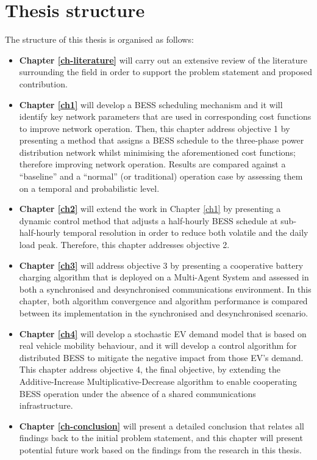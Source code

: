 \section{Thesis structure}
\label{ch-introduction:sec:thesis-structure}

The structure of this thesis is organised as follows:

\begin{itemize}
	\item
	\textbf{Chapter \ref{ch-literature}} will carry out an extensive review of the literature surrounding the field in order to support the problem statement and proposed contribution.
	\item
	\textbf{Chapter \ref{ch1}} will develop a BESS scheduling mechanism and it will identify key network parameters that are used in corresponding cost functions to improve network operation.
	Then, this chapter address objective 1 by presenting a method that assigns a BESS schedule to the three-phase power distribution network whilst minimising the aforementioned cost functions; therefore improving network operation.
	Results are compared against a ``baseline'' and a ``normal'' (or traditional) operation case by assessing them on a temporal and probabilistic level.
	\item
	\textbf{Chapter \ref{ch2}} will extend the work in Chapter \ref{ch1} by presenting a dynamic control method that adjusts a half-hourly BESS schedule at sub-half-hourly temporal resolution in order to reduce both volatile and the daily load peak.
	Therefore, this chapter addresses objective 2.
	\item
	\textbf{Chapter \ref{ch3}} will address objective 3 by presenting a cooperative battery charging algorithm that is deployed on a Multi-Agent System and assessed in both a synchronised and desynchronised communications environment.
	In this chapter, both algorithm convergence and algorithm performance is compared between its implementation in the synchronised and desynchronised scenario.
	\item
	\textbf{Chapter \ref{ch4}} will develop a stochastic EV demand model that is based on real vehicle mobility behaviour, and it will develop a control algorithm for distributed BESS to mitigate the negative impact from those EV's demand.
	This chapter address objective 4, the final objective, by extending the Additive-Increase Multiplicative-Decrease algorithm to enable cooperating BESS operation under the absence of a shared communications infrastructure.
	\item
	\textbf{Chapter \ref{ch-conclusion}} will present a detailed conclusion that relates all findings back to the initial problem statement, and this chapter will present potential future work based on the findings from the research in this thesis.
\end{itemize}